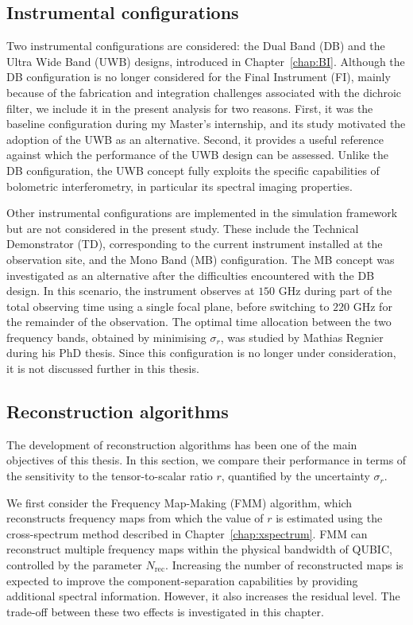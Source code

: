 \documentclass[../../thesis.tex]{subfiles}
\begin{document}
\subsection{Instrumental configurations}

Two instrumental configurations are considered: the Dual Band (DB) and the Ultra Wide Band (UWB) designs, introduced in Chapter~\ref{chap:BI}. Although the DB configuration is no longer considered for the Final Instrument (FI), mainly because of the fabrication and integration challenges associated with the dichroic filter, we include it in the present analysis for two reasons. First, it was the baseline configuration during my Master's internship, and its study motivated the adoption of the UWB as an alternative. Second, it provides a useful reference against which the performance of the UWB design can be assessed. Unlike the DB configuration, the UWB concept fully exploits the specific capabilities of bolometric interferometry, in particular its spectral imaging properties.

Other instrumental configurations are implemented in the simulation framework but are not considered in the present study. These include the Technical Demonstrator (TD), corresponding to the current instrument installed at the observation site, and the Mono Band (MB) configuration. The MB concept was investigated as an alternative after the difficulties encountered with the DB design. In this scenario, the instrument observes at $150$ GHz during part of the total observing time using a single focal plane, before switching to $220$ GHz for the remainder of the observation. The optimal time allocation between the two frequency bands, obtained by minimising $\sigma_r$, was studied by Mathias Regnier during his PhD thesis\cite{mathiasthesis}. Since this configuration is no longer under consideration, it is not discussed further in this thesis.

\subsection{Reconstruction algorithms}

The development of reconstruction algorithms has been one of the main objectives of this thesis. In this section, we compare their performance in terms of the sensitivity to the tensor-to-scalar ratio $r$, quantified by the uncertainty $\sigma_r$.

We first consider the Frequency Map-Making (FMM) algorithm, which reconstructs frequency maps from which the value of $r$ is estimated using the cross-spectrum method described in Chapter~\ref{chap:xspectrum}. FMM can reconstruct multiple frequency maps within the physical bandwidth of QUBIC, controlled by the parameter $N_\text{rec}$. Increasing the number of reconstructed maps is expected to improve the component-separation capabilities by providing additional spectral information. However, it also increases the residual level. The trade-off between these two effects is investigated in this chapter.
\end{document}

